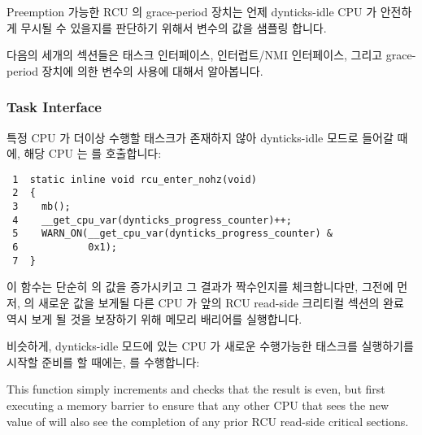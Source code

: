 Preemption 가능한 RCU 의 grace-period 장치는 언제 dynticks-idle CPU 가 안전하게
무시될 수 있을지를 판단하기 위해서  변수의 값을
샘플링 합니다.

다음의 세개의 섹션들은 태스크 인터페이스, 인터럽트/NMI 인터페이스, 그리고
grace-period 장치에 의한  변수의 사용에 대해서
알아봅니다.
\iffalse

Preemptible RCU's grace-period machinery samples the value of
the \co{dynticks_progress_counter} variable in order to
determine when a dynticks-idle CPU may safely be ignored.

The following three sections give an overview of the task
interface, the interrupt/NMI interface, and the use of
the \co{dynticks_progress_counter} variable by the
grace-period machinery.
\fi

\subsubsection{Task Interface}
\label{sec:formal:Task Interface}

특정 CPU 가 더이상 수행할 태스크가 존재하지 않아 dynticks-idle 모드로 들어갈
때에, 해당 CPU 는  를 호출합니다:
\iffalse

When a given CPU enters dynticks-idle mode because it has no more
tasks to run, it invokes \co{rcu_enter_nohz()}:
\fi

{ \scriptsize
\begin{verbatim}
 1  static inline void rcu_enter_nohz(void)
 2  {
 3    mb();
 4    __get_cpu_var(dynticks_progress_counter)++;
 5    WARN_ON(__get_cpu_var(dynticks_progress_counter) &
 6            0x1);
 7  }
\end{verbatim}
}

이 함수는 단순히  의 값을 증가시키고 그 결과가
짝수인지를 체크합니다만, 그전에 먼저,  의 새로운
값을 보게될 다른 CPU 가 앞의 RCU read-side 크리티컬 섹션의 완료 역시 보게 될
것을 보장하기 위해 메모리 배리어를 실행합니다.

비슷하게, dynticks-idle 모드에 있는 CPU 가 새로운 수행가능한 태스크를
실행하기를 시작할 준비를 할 때에는,  를 수행합니다:
\iffalse

This function simply increments  and
checks that the result is even, but first executing a memory barrier
to ensure that any other CPU that sees the new value of
 will also see the completion
of any prior RCU read-side critical sections.

